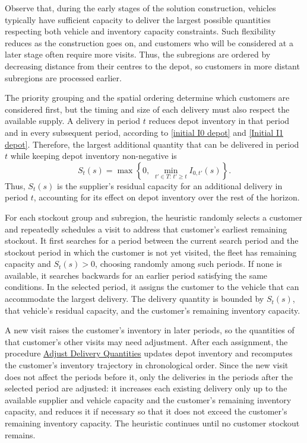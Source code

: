 \documentclass{article}
\begin{document}
Observe that, during the early stages of the solution construction, vehicles typically have sufficient capacity to deliver the largest possible quantities respecting both vehicle and inventory capacity constraints. Such flexibility reduces as the construction goes on, and customers who will be considered at a later stage often require more visits. Thus, the subregions are ordered by decreasing distance from their centres to the depot, so customers in more distant subregions are processed earlier.


The priority grouping and the spatial ordering determine which customers are considered first, but the timing and size of each delivery must also respect the available supply. A delivery in period $t$ reduces depot inventory in that period and in every subsequent period, according to \eqref{initial I0 depot} and \eqref{Initial I1 depot}. Therefore, the largest additional quantity that can be delivered in period $t$ while keeping depot inventory non-negative is
\begin{equation}\label{supply slack}
S_t(s)=\max\left\{0,\;\min_{t'\in T:\,t'\geq t} I_{0,t'}(s)\right\}.
\end{equation}
Thus, $S_t(s)$ is the supplier's residual capacity for an additional delivery in period $t$, accounting for its effect on depot inventory over the rest of the horizon. 

For each stockout group and subregion, the heuristic randomly selects a customer and repeatedly schedules a visit to address that customer's earliest remaining stockout. It first searches for a period between the current search period and the stockout period in which the customer is not yet visited, the fleet has remaining capacity and $S_t(s)>0$, choosing randomly among such periods. If none is available, it searches backwards for an earlier period satisfying the same conditions. In the selected period, it assigns the customer to the vehicle that can accommodate the largest delivery. The delivery quantity is bounded by $S_t(s)$, that vehicle's residual capacity, and the customer's remaining inventory capacity.

A new visit raises the customer's inventory in later periods, so the quantities of that customer's other visits may need adjustment. After each assignment, the procedure \hyperref[alg:AdjustDeliveryQuantities]{Adjust Delivery Quantities} updates depot inventory and recomputes the customer's inventory trajectory in chronological order. Since the new visit does not affect the periods before it, only the deliveries in the periods after the selected period are adjusted: it increases each existing delivery only up to the available supplier and vehicle capacity and the customer's remaining inventory capacity, and reduces it if necessary so that it does not exceed the customer's remaining inventory capacity. The heuristic continues until no customer stockout remains.
\end{document}
